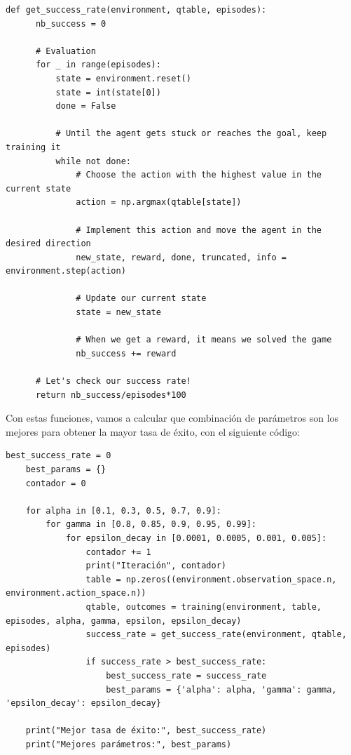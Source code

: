 \documentclass{article}
\begin{document}
\vspace{0.5cm}

\begin{lstlisting}[style=mystyle]
    def get_success_rate(environment, qtable, episodes):
      nb_success = 0
    
      # Evaluation
      for _ in range(episodes):
          state = environment.reset()
          state = int(state[0])
          done = False
          
          # Until the agent gets stuck or reaches the goal, keep training it
          while not done:
              # Choose the action with the highest value in the current state
              action = np.argmax(qtable[state])
    
              # Implement this action and move the agent in the desired direction
              new_state, reward, done, truncated, info = environment.step(action)
    
              # Update our current state
              state = new_state
    
              # When we get a reward, it means we solved the game
              nb_success += reward
    
      # Let's check our success rate!
      return nb_success/episodes*100
\end{lstlisting}

\vspace{0.5cm}

Con estas funciones, vamos a calcular que combinación de parámetros son los mejores para obtener la mayor tasa de éxito, con el siguiente código:

\vspace{0.5cm}

\begin{lstlisting}[style=mystyle]
    best_success_rate = 0
    best_params = {}
    contador = 0
    
    for alpha in [0.1, 0.3, 0.5, 0.7, 0.9]:
        for gamma in [0.8, 0.85, 0.9, 0.95, 0.99]:
            for epsilon_decay in [0.0001, 0.0005, 0.001, 0.005]:
                contador += 1
                print("Iteración", contador)
                table = np.zeros((environment.observation_space.n, environment.action_space.n))
                qtable, outcomes = training(environment, table, episodes, alpha, gamma, epsilon, epsilon_decay)
                success_rate = get_success_rate(environment, qtable, episodes)
                if success_rate > best_success_rate:
                    best_success_rate = success_rate
                    best_params = {'alpha': alpha, 'gamma': gamma, 'epsilon_decay': epsilon_decay}
    
    print("Mejor tasa de éxito:", best_success_rate)
    print("Mejores parámetros:", best_params)
\end{lstlisting}
\end{document}
